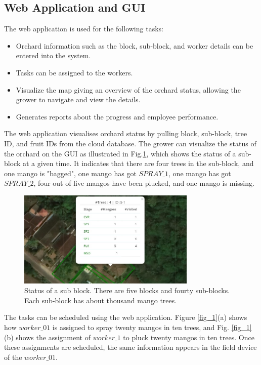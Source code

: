 \documentclass[journal]{IEEEtran}
\begin{document}
\subsection{Web Application and GUI}
The web application is used for the following tasks:
\begin{itemize}
	\item Orchard information such as the block, sub-block, and worker details can be entered into the system.
	\item Tasks can be assigned to the workers.
	\item Visualize the map giving an overview of the orchard status, allowing the grower to navigate and view the details.
	\item Generates reports about the progress and employee performance.
\end{itemize}
The web application visualises orchard status by pulling block, sub-block, tree ID, and fruit IDs from the cloud database. The grower can visualize the status of the orchard on the GUI as illustrated in Fig.\ref{fig_status}, which shows the status of a sub-block at a given time. It indicates that there are four trees in the sub-block, and one mango is "bagged", one mango has got $SPRAY\_1$, one mango has got $SPRAY\_2$, four out of five mangos have been plucked, and one mango is missing.
\begin{figure}[h]
	\centering
	\includegraphics[width = 8.5cm]{graphics/map.jpg}
	\caption{Status of a sub block. There are five blocks and fourty sub-blocks. Each sub-block has about thousand mango trees.}
	\label{fig_status}
\end{figure}
The tasks can be scheduled using the web application.
Figure \ref{fig_1}(a) shows how $worker\_01$ is assigned to spray twenty mangos in ten trees, and Fig. \ref{fig_1}(b) shows the assignment of $worker\_1$ to pluck twenty mangos in ten trees. Once these assignments are scheduled, the same information appears in the field device of the $worker\_01$.
\end{document}
